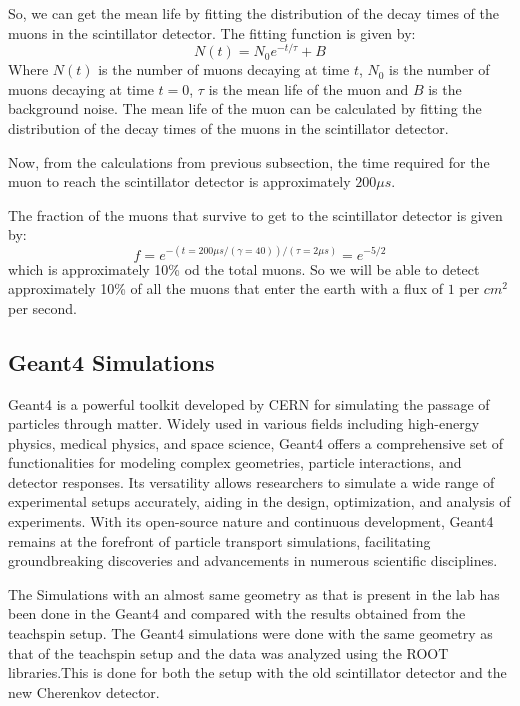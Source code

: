 \documentclass{article}
\begin{document}
\begin{multicols}{2}
So, we can get the mean life by fitting the distribution of the decay times of the muons in the scintillator detector. The fitting function is given by:
\begin{equation}
    N(t) = N_0 e^{-t/\tau} + B
\end{equation}
Where $N(t)$ is the number of muons decaying at time $t$, $N_0$ is the number of muons decaying at time $t=0$, $\tau$ is the mean life of the muon and $B$ is the background noise. The mean life of the muon can be calculated by fitting the distribution of the decay times of the muons in the scintillator detector.


Now, from the calculations from previous subsection, the time required for the muon to reach the scintillator detector is approximately $200 \mu s$. 




The fraction of the muons that survive to get to the scintillator detector is given by:
\begin{equation}
    f = e^{-(t=200 \mu s /(\gamma = 40) )/(\tau = 2 \mu s)} = e^{-5/2}
\end{equation}
which is approximately 10\% od the total muons.
So we will be able to detect approximately 10\% of all the muons that enter the earth with a flux of $1$ per $cm^2$ per second.




\subsection{Geant4 Simulations}

Geant4 is a powerful toolkit developed by CERN for simulating the passage of particles through matter. Widely used in various fields including high-energy physics, medical physics, and space science, Geant4 offers a comprehensive set of functionalities for modeling complex geometries, particle interactions, and detector responses. Its versatility allows researchers to simulate a wide range of experimental setups accurately, aiding in the design, optimization, and analysis of experiments. With its open-source nature and continuous development, Geant4 remains at the forefront of particle transport simulations, facilitating groundbreaking discoveries and advancements in numerous scientific disciplines.

The Simulations with an almost same geometry as that is present in the lab has been done in the Geant4 and compared with the results obtained from the teachspin setup. The Geant4 simulations were done with the same geometry as that of the teachspin setup and the data was analyzed using the ROOT libraries.This is done for both the setup with the old scintillator detector and the new Cherenkov detector.



\end{multicols}
\end{document}
